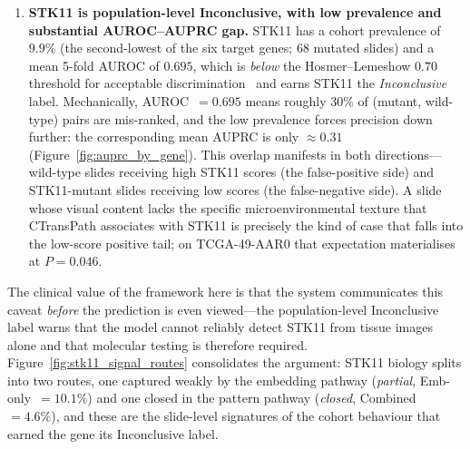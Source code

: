 \begin{enumerate}
    \item \textbf{STK11 is population-level Inconclusive, with
    low prevalence and substantial AUROC--AUPRC gap.}
    STK11 has a cohort prevalence of $9.9\%$ (the
    second-lowest of the six target genes; $68$ mutated slides)
    and a mean 5-fold AUROC of $0.695$, which is \emph{below}
    the Hosmer--Lemeshow $0.70$ threshold for acceptable
    discrimination~\cite{hosmer2000applied} and earns STK11 the
    \emph{Inconclusive} label.
    Mechanically, AUROC~$= 0.695$ means roughly $30\%$ of
    (mutant, wild-type) pairs are mis-ranked, and the low
    prevalence forces precision down further: the corresponding
    mean AUPRC is only $\approx 0.31$
    (Figure~\ref{fig:auprc_by_gene}).
    This overlap manifests in both directions---wild-type
    slides receiving high STK11 scores (the false-positive
    side) and STK11-mutant slides receiving low scores (the
    false-negative side).
    A slide whose visual content lacks the specific
    micro\-en\-vi\-ron\-mental texture that CTransPath
    associates with STK11 is precisely the kind of case that
    falls into the low-score positive tail; on TCGA-49-AAR0
    that expectation materialises at $P = 0.046$.
\end{enumerate}

The clinical value of the framework here is that the system
communicates this caveat \emph{before} the prediction is even
viewed---the population-level Inconclusive label warns that the
model cannot reliably detect STK11 from tissue images alone and
that molecular testing is therefore required.
Figure~\ref{fig:stk11_signal_routes} consolidates the argument:
STK11 biology splits into two routes, one captured weakly by
the embedding pathway (\emph{partial},
Emb-only~$= 10.1\%$) and one closed in the pattern pathway
(\emph{closed}, Combined~$= 4.6\%$), and these are the
slide-level signatures of the cohort behaviour that earned the
gene its Inconclusive label.

